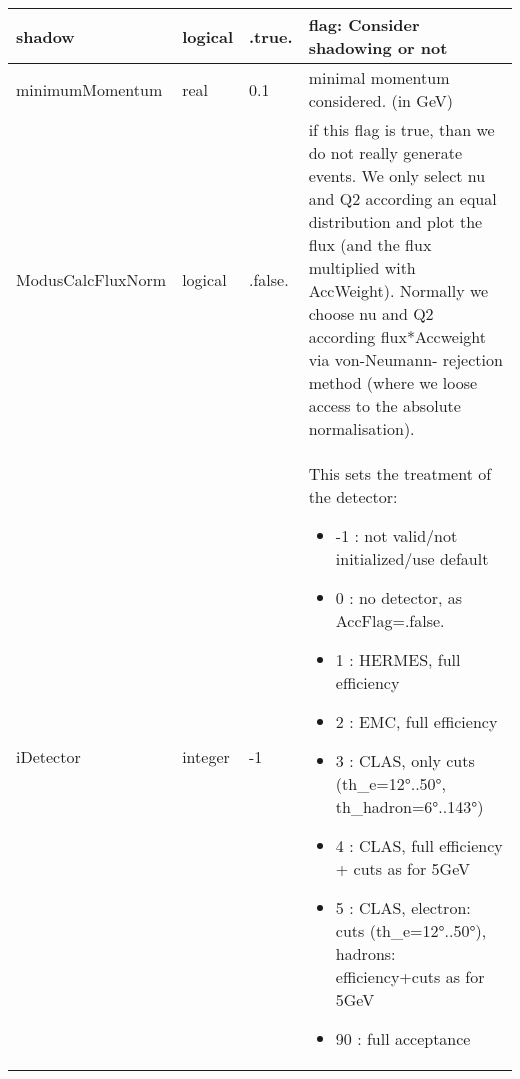 \documentclass{article}
\begin{document}
\begin{longtable}{llll}
\midrule
shadow & \begin{minipage}[t]{2cm}logical\end{minipage} & \begin{minipage}[t]{2cm}.true.\end{minipage} & \begin{minipage}[t]{12cm}flag: Consider shadowing or not\end{minipage}\\*
\midrule
minimumMomentum & \begin{minipage}[t]{2cm}real\end{minipage} & \begin{minipage}[t]{2cm}0.1\end{minipage} & \begin{minipage}[t]{12cm}minimal momentum considered. (in GeV)\end{minipage}\\*
\midrule
ModusCalcFluxNorm & \begin{minipage}[t]{2cm}logical\end{minipage} & \begin{minipage}[t]{2cm}.false.\end{minipage} & \begin{minipage}[t]{12cm}if this flag is true, than we do not really generate events. We only select nu and Q2 according an equal distribution and plot the flux (and the flux multiplied with AccWeight). Normally we choose nu and Q2 according flux*Accweight via von-Neumann- rejection method (where we loose access to the absolute normalisation).\end{minipage}\\*
\midrule
iDetector & \begin{minipage}[t]{2cm}integer\end{minipage} & \begin{minipage}[t]{2cm}-1\end{minipage} & \begin{minipage}[t]{12cm}This sets the treatment of the detector:\begin{itemize}\leftmargin0em\itemindent0pt\item -1 : not valid/not initialized/use default\item  0 : no detector, as AccFlag=.false.\item  1 : HERMES, full efficiency\item  2 : EMC, full efficiency\item  3 : CLAS, only cuts (th\_e=12°..50°, th\_hadron=6°..143°)\item  4 : CLAS, full efficiency + cuts as for 5GeV\item  5 : CLAS, electron: cuts (th\_e=12°..50°),              hadrons: efficiency+cuts as for 5GeV\item 90 : full acceptance\end{itemize}\end{minipage}\\*

\end{longtable}
\end{document}
